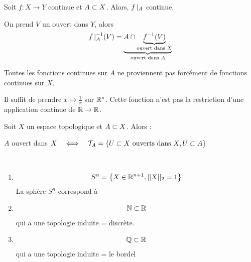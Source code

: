 \documentclass[french,a4paper,10pt]{article}
\begin{document}
		\begin{proposition}
			Soit $f\colon X\to Y$ continue et $A\subset X$. Alors, $f\mathop{}\!|_{A}$ continue.
			
		\end{proposition}
	
		\begin{myproof}
			On prend $V$ un ouvert dans $Y$, alors
				\[\begin{aligned}
					f\mathop{}\!|_{A}^{-1}(V)=\underbrace{A\cap \underbrace{f^{-1}(V)}_{\text{ouvert dans }X}}_{\text{ouvert dans }A}
				\end{aligned}\]
		\end{myproof}
	
		\begin{remark}
			Toutes les fonctions continues sur $A$ ne proviennent pas forcément de fonctions continues sur $X$.
		\end{remark}
	
		\begin{example}
			Il suffit de prendre $x\mapsto\frac1x$ sur $\mathbb{R}^\ast$. Cette fonction n'est pas la restriction d'une application continue de $\mathbb{R}\to\mathbb{R}$.
		\end{example}
		\begin{exercise}
			Soit $X$ un espace topologique et $A\subset X$. Alors : 
			\begin{center}
				$A$ ouvert dans $X\quad\Longleftrightarrow\quad\mathcal T_A=\left\{U\subset X\text{ ouverts dans } X,U\subset A\right\}$
			\end{center}
		\end{exercise}
		\begin{example}\,
			\begin{enumerate}[label=$(\roman*)$]
				\item 
					\[\begin{aligned}
						S^n=\left\{X\in\mathbb{R}^{n+1},||X||_2=1\right\}
					\end{aligned}\]
					La sphère $S^n$ correspond à
					\begin{center}
					\end{center}		
				\item 
					\[\begin{aligned}
						\mathbb{N}\subset \mathbb{R}
					\end{aligned}\]
					qui a une topologie induite = discrète.
					
				\item 
					\[\begin{aligned}
						\mathbb{Q}\subset \mathbb{R}
					\end{aligned}\]
					qui a une topologie induite = le bordel
			\end{enumerate}
		\end{example}
\end{document}

